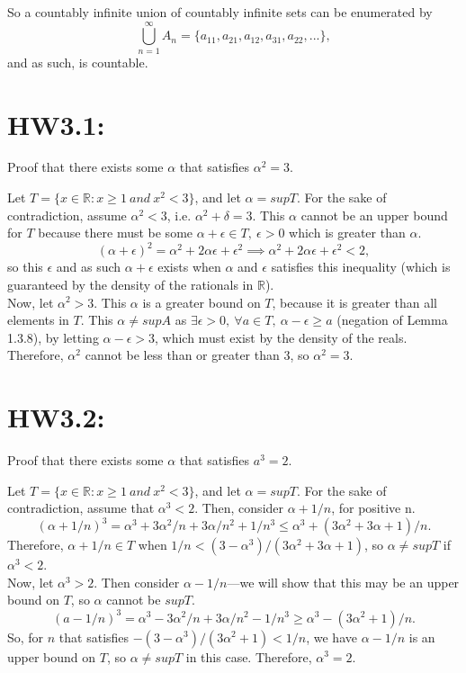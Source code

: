 \documentclass[12pt,letterpaper]{article}
\begin{document}
So a countably infinite union of countably infinite sets can be enumerated by \[\bigcup_{n = 1}^{\infty} A_{n} = \{a_{11}, a_{21}, a_{12}, a_{31}, a_{22}, ...\},\] and as such, is countable.

\section*{HW3.1:}
Proof that there exists some \(\alpha\) that satisfies \(\alpha^{2} = 3\).

Let \(T = \{x \in \mathbb{R} : x \geq 1\ and\ x^{2} < 3\}\), and let \(\alpha = supT\). For the sake of contradiction, assume \(\alpha^{2} < 3\), i.e. \(\alpha^{2} + \delta = 3\). This \(\alpha\) cannot be an upper bound for \(T\) because there must be some \(\alpha + \epsilon \in T,\ \epsilon > 0\) which is greater than \(\alpha\). \[(\alpha + \epsilon)^{2} = \alpha^{2} + 2\alpha\epsilon + \epsilon^{2} \implies \alpha^{2} + 2\alpha\epsilon + \epsilon^{2} < 2,\] so this \(\epsilon\) and as such \(\alpha + \epsilon\) exists when \(\alpha\) and \(\epsilon\) satisfies this inequality (which is guaranteed by the density of the rationals in \(\mathbb{R}\)). \\

Now, let \(\alpha^{2} > 3\). This \(\alpha\) is a greater bound on \(T\), because it is greater than all elements in \(T\). This \(\alpha \neq supA\) as \(\exists \epsilon > 0,\ \forall a \in T,\ \alpha - \epsilon \geq a\) (negation of Lemma 1.3.8), by letting \(\alpha - \epsilon > 3\), which must exist by the density of the reals. Therefore, \(\alpha^{2}\) cannot be less than or greater than \(3\), so \(\alpha^{2} = 3\).

\section*{HW3.2:}
Proof that there exists some \(\alpha\) that satisfies \(a^{3} = 2\). 

Let \(T = \{x \in \mathbb{R} : x \geq 1\ and\ x^{2} < 3\}\), and let \(\alpha = supT\). For the sake of contradiction, assume that \(\alpha^{3} < 2\). Then, consider \(\alpha + 1/n\), for positive n. \[(\alpha + 1/n)^{3} = \alpha^{3} + 3\alpha^{2}/n + 3\alpha/n^{2} + 1/n^{3} \leq \alpha^{3} + (3\alpha^{2} + 3\alpha + 1)/n.\] Therefore, \(\alpha + 1/n \in T\) when \(1/n < (3-\alpha^{3})/(3\alpha^{2} + 3\alpha + 1)\), so \(\alpha \neq supT\) if \(\alpha^{3} < 2\). \\

Now, let \(\alpha^{3} > 2\). Then consider \(\alpha - 1/n\)---we will show that this may be an upper bound on \(T\), so \(\alpha\) cannot be \(supT\). \[(a - 1/n)^{3} = \alpha^{3} - 3\alpha^{2}/n + 3\alpha/n^{2} - 1/n^{3} \geq \alpha^{3} - (3\alpha^{2} + 1)/n.\] So, for \(n\) that satisfies \(-(3-\alpha^{3})/(3\alpha^{2} + 1) < 1/n\), we have \(\alpha - 1/n\) is an upper bound on \(T\), so \(\alpha \neq supT\) in this case. Therefore, \(\alpha^{3} = 2\).
 
 
\end{document}
